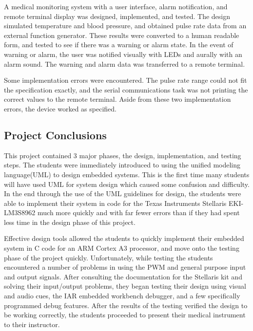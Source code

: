 \documentclass[12pt]{article} %
\begin{document}
    A medical monitoring system with a user interface, alarm notification, and
    remote terminal display was designed, implemented, and tested.  The design
    simulated temperature and blood pressure, and obtained pulse rate data from
    an external function generator.  These results were converted to a human
    readable form, and tested to see if there was a warning or alarm state.
    In the event of warning or alarm, the user was notified visually with LEDs
    and aurally with an alarm sound.  The warning and alarm data was transferred
    to a remote terminal.  

    Some implementation errors were encountered.  The pulse rate range could
    not fit the specification exactly, and the serial communications task was
    not printing the correct values to the remote terminal. Aside from these
    two implementation errors, the device worked as specified.

    \subsection{Project Conclusions} 
    
    This project contained 3 major phases, the design, implementation, and
    testing steps. The students were immediately introduced to using the
    unified modeling language(UML) to design embedded systems. This is the
    first time many students will have used UML for system design which caused
    some confusion and difficulty. In the end through the use of the UML
    guidelines for design, the students were able to implement their system in
    code for the Texas Instruments Stellaris EKI-LM3S8962 much more quickly and
    with far fewer errors than if they had spent less time in the design phase
    of this project. 

    Effective design tools allowed the students to quickly implement their embedded
    system in C code for an ARM Cortex A3 processor, and move onto the testing
    phase of the project quickly. Unfortunately, while testing the students
    encountered a number of problems in using the PWM and general purpose input and
    output signals. After consulting the documentation for the Stellaris kit and
    solving their input/output problems, they began testing their design using
    visual and audio cues, the IAR embedded workbench debugger, and a few
    specifically programmed debug features. After the results of the testing
    verified the design to be working correctly, the students proceeded to present
    their medical instrument to their instructor.
\end{document}
